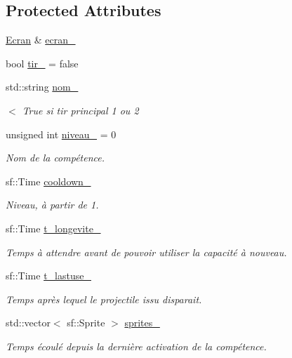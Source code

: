 \subsection*{Protected Attributes}
\begin{DoxyCompactItemize}
\item 
\mbox{\hyperlink{class_ecran}{Ecran}} \& \mbox{\hyperlink{class_capacite_a12c1527d4ab9b80bd9e2174d92d00639}{ecran\+\_\+}}
\item 
bool \mbox{\hyperlink{class_capacite_ae5318fb64d0def1069a9730c497d4bb6}{tir\+\_\+}} = false
\item 
std\+::string \mbox{\hyperlink{class_capacite_a430472b509233086cbad1d6d8332dc8c}{nom\+\_\+}}
\begin{DoxyCompactList}\small\item\em $<$ True si tir principal 1 ou 2 \end{DoxyCompactList}\item 
unsigned int \mbox{\hyperlink{class_capacite_abf2ac63aa5928299c14581e681a16328}{niveau\+\_\+}} = 0
\begin{DoxyCompactList}\small\item\em Nom de la compétence. \end{DoxyCompactList}\item 
sf\+::\+Time \mbox{\hyperlink{class_capacite_a31264cab5a0e14cd05626727abb7fa83}{cooldown\+\_\+}}
\begin{DoxyCompactList}\small\item\em Niveau, à partir de 1. \end{DoxyCompactList}\item 
sf\+::\+Time \mbox{\hyperlink{class_capacite_a73a85c61740d7359eacfec10e152a268}{t\+\_\+longevite\+\_\+}}
\begin{DoxyCompactList}\small\item\em Temps à attendre avant de pouvoir utiliser la capacité à nouveau. \end{DoxyCompactList}\item 
sf\+::\+Time \mbox{\hyperlink{class_capacite_a0f1d7e4b84ef86c985401d9b12e1d4ca}{t\+\_\+lastuse\+\_\+}}
\begin{DoxyCompactList}\small\item\em Temps après lequel le projectile issu disparait. \end{DoxyCompactList}\item 
std\+::vector$<$ sf\+::\+Sprite $>$ \mbox{\hyperlink{class_capacite_a8324d922ef794601f393966caabfb6eb}{sprites\+\_\+}}
\begin{DoxyCompactList}\small\item\em Temps écoulé depuis la dernière activation de la compétence. \end{DoxyCompactList}\item 

\end{DoxyCompactItemize}
